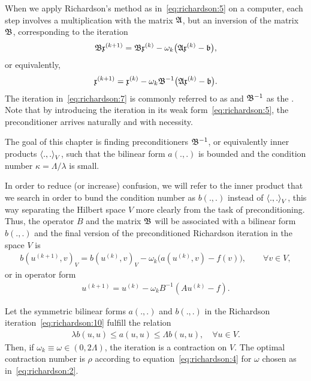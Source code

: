 \begin{definition}
  When we apply Richardson's method as in~\eqref{eq:richardson:5} on a
  computer, each step involves a multiplication with the matrix $\mathfrak{A}$,
  but an inversion of the matrix $\mathfrak{B}$, corresponding to the iteration
  \begin{gather*}
    \mathfrak{B} \mathfrak{x}^{(k+1)}
    = \mathfrak{B} \mathfrak{x}^{(k)}
    - \omega_k \bigl(\mathfrak{A} \mathfrak{x}^{(k)} - \mathfrak{b} \bigr),
  \end{gather*}
  or equivalently,
  \begin{gather}
    \label{eq:richardson:7}
    \mathfrak{x}^{(k+1)}
    = \mathfrak{x}^{(k)}
    - \omega_k \mathfrak{B}^{-1}\bigl(\mathfrak{A} \mathfrak{x}^{(k)} - \mathfrak{b} \bigr).
  \end{gather}
  The iteration in~\eqref{eq:richardson:7} is commonly referred to as
   and $\mathfrak{B}^{-1}$ as the
  . Note that by introducing the iteration in
  its weak form~\eqref{eq:richardson:5}, the preconditioner arrives
  naturally and with necessity.
  
  The goal of this chapter is finding preconditioners $\mathfrak{B}^{-1}$, or
  equivalently inner products $\scal(.,.)_V$, such that the bilinear
  form $a(.,.)$ is bounded and the condition number
  $\kappa = \Lambda/\lambda$ is small.
  
  In order to reduce (or increase) confusion, we will refer to the
  inner product that we search in order to bund the condition number
  as $b(.,.)$ instead of $\scal(.,.)_V$, this way separating the
  Hilbert space $V$ more clearly from the task of
  preconditioning. Thus, the operator $B$ and the matrix $\mathfrak{B}$ will
  be associated with a bilinear form $b(.,.)$ and the final version of
  the preconditioned Richardson iteration in the space $V$ is
  \begin{gather}
    \label{eq:richardson:10}
    b(u^{(k+1)},v)_V = b(u^{(k)},v)_V
    - \omega_k \bigl(a(u^{(k)},v) - f(v)\bigr), \qquad \forall v\in V,
  \end{gather}
  or in operator form
  \begin{gather}
    \label{eq:richardson:11}
    u^{(k+1)} = u^{(k)} - \omega_k B^{-1} (A u^{(k)} - f).
  \end{gather}
\end{definition}

\begin{corollary}
  Let the symmetric bilinear forms $a(.,.)$ and $b(.,.)$ in the
  Richardson iteration~\eqref{eq:richardson:10} fulfill the
   relation
  \begin{gather}
    \label{eq:richardson:12}
    \lambda b(u,u) \le a(u,u) \le \Lambda b(u,u), \quad \forall u\in V.
  \end{gather}
  Then, if $\omega_k \equiv \omega \in (0,2\Lambda)$, the iteration is
  a contraction on $V$. The optimal contraction number is $\rho$
  according to equation~\eqref{eq:richardson:4} for $\omega$ chosen as
  in~\eqref{eq:richardson:2}.
\end{corollary}

